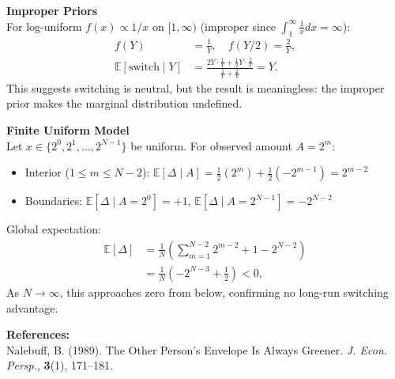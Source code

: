 \begin{technical}
\textbf{Improper Priors}\\[0.2em]
For log-uniform $f(x) \propto 1/x$ on $[1, \infty)$ (improper since $\int_1^{\infty} \frac{1}{x} dx = \infty$):
\begin{align*}
f(Y) &= \frac{1}{Y}, \quad f(Y/2) = \frac{2}{Y},\\
\mathbb{E}[\text{switch} \mid Y] &= \frac{2Y \cdot \frac{1}{Y} + \tfrac{1}{2}Y \cdot \frac{2}{Y}}{\frac{1}{Y} + \frac{2}{Y}} = Y.
\end{align*}
This suggests switching is neutral, but the result is meaningless: the improper prior makes the marginal distribution undefined. 

\textbf{Finite Uniform Model}\\[0.2em]
Let $x \in \{2^0, 2^1, \dots, 2^{N-1}\}$ be uniform. For observed amount $A = 2^m$:
\begin{itemize}[topsep=0pt,itemsep=2pt]
\item Interior ($1 \le m \le N - 2$): $\mathbb{E}[\Delta \mid A] = \tfrac{1}{2}(2^m) + \tfrac{1}{2}(-2^{m-1}) = 2^{m-2}$
\item Boundaries: $\mathbb{E}[\Delta \mid A = 2^0] = +1$, $\mathbb{E}[\Delta \mid A = 2^{N-1}] = -2^{N-2}$
\end{itemize}
Global expectation:
\begin{align*}
\mathbb{E}[\Delta] &= \frac{1}{N} \left( \sum_{m=1}^{N-2} 2^{m-2} + 1 - 2^{N-2} \right) \\
&= \frac{1}{N} \left( -2^{N-3} + \tfrac{1}{2} \right) < 0,
\end{align*}
As $N \to \infty$, this approaches zero from below, confirming no long-run switching advantage.

\textbf{References:}\\
{\footnotesize
Nalebuff, B. (1989). The Other Person's Envelope Is Always Greener. \textit{J. Econ. Persp.}, \textbf{3}(1), 171--181.
}
\end{technical}

